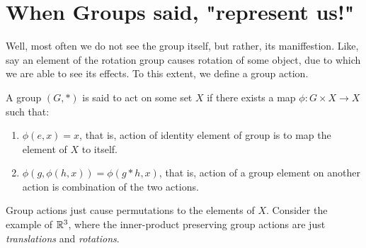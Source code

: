\section{When Groups said, "represent us!"}
Well, most often we do not see the group itself, but rather, its maniffestion. Like, say an element of the rotation group causes rotation of some object, due to which we are able to see its effects. To this extent, we define a group action.
\begin{definition}
    A group $(G,*)$ is said to act on some set $X$ if there exists a map $\phi: G\times X\rightarrow X$ such that:
    \begin{enumerate}
        \item $\phi(e,x) = x$, that is, action of identity element of group is to map the element of $X$ to itself.
        \item $\phi(g, \phi(h,x))= \phi(g*h, x)$, that is, action of a group element on another action is combination of the two actions.
    \end{enumerate}
\end{definition}
Group actions just cause permutations to the elements of $X$. Consider the example of $\mathbb{R}^3$, where the inner-product preserving group actions are just \textit{translations} and \textit{rotations}. \\[0.2cm]

